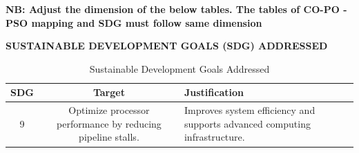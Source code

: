 \documentclass[11pt]{report}
\begin{document}
\textbf{NB: Adjust the dimension of the below tables. The tables of CO-PO -PSO mapping and SDG must follow same dimension}


\begin{table}[h!]
\centering
\caption{CO--PO/PSO Articulation Matrix}
\label{tab:copo}
\renewcommand{\arraystretch}{1.0}
\end{table}

\vspace{0.7cm}

\begin{center}
\textbf{\large SUSTAINABLE DEVELOPMENT GOALS (SDG) ADDRESSED}
\end{center}

\vspace{0.3cm}

\begin{table}[h!]
\centering
\caption{Sustainable Development Goals Addressed}
\label{tab:sdg}
\renewcommand{\arraystretch}{1.3}
\begin{tabular}{|c|c|p{6.2cm}|}
\hline
\textbf{SDG} & \textbf{Target} & \textbf{Justification} \\
\hline

9 & Optimize processor performance by reducing pipeline stalls. &
Improves system efficiency and supports advanced computing infrastructure.  \\
\hline

\end{tabular}
\end{table}
\end{document}
